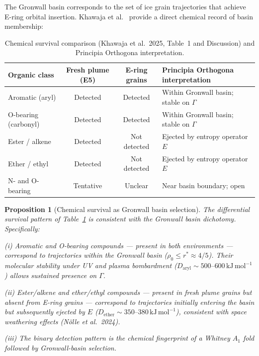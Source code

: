 \documentclass[12pt]{article}
\numberwithin{equation}{section}
\newtheorem{proposition}[theorem]{Proposition}
\theoremstyle{remark}
\begin{document}
The Gronwall basin corresponds to the set of ice grain trajectories that achieve
E-ring orbital insertion. Khawaja et al.~\cite{Khawaja2025} provide a direct
chemical record of basin membership:

\begin{table}[ht]
\centering
\small
\begin{tabular}{p{3.3cm}ccp{5.0cm}}
\toprule
Organic class & Fresh plume (E5) & E-ring grains & Principia Orthogona interpretation \\
\midrule
Aromatic (aryl) & Detected & Detected & Within Gronwall basin; stable on $\Gamma$ \\
O-bearing (carbonyl) & Detected & Detected & Within Gronwall basin; stable on $\Gamma$ \\
Ester / alkene & Detected & Not detected & Ejected by entropy operator $E$ \\
Ether / ethyl & Detected & Not detected & Ejected by entropy operator $E$ \\
N- and O-bearing & Tentative & Unclear & Near basin boundary; open \\
\bottomrule
\end{tabular}
\caption{Chemical survival comparison (Khawaja et al.\ 2025, Table~1 and Discussion)
and Principia Orthogona interpretation.}
\label{tab:chemistry}
\end{table}

\begin{proposition}[Chemical survival as Gronwall basin selection]
The differential survival pattern of Table~\ref{tab:chemistry} is consistent
with the Gronwall basin dichotomy. Specifically:

\emph{(i)} Aromatic and O-bearing compounds --- present in both environments ---
correspond to trajectories within the Gronwall basin ($\rho_0 \leq r^*\approx 4/5$).
Their molecular stability under UV and plasma bombardment
($D_{\mathrm{aryl}}\sim 500\text{--}600\,\mathrm{kJ\,mol}^{-1}$)
allows sustained presence on $\Gamma$.

\emph{(ii)} Ester/alkene and ether/ethyl compounds --- present in fresh plume grains
but absent from E-ring grains --- correspond to trajectories initially entering
the basin but subsequently ejected by $E$
($D_{\mathrm{ether}}\sim 350\text{--}380\,\mathrm{kJ\,mol}^{-1}$),
consistent with space weathering effects (N{\"o}lle et al.\ 2024).

\emph{(iii)} The binary detection pattern is the chemical fingerprint of a
Whitney $A_1$ fold followed by Gronwall-basin selection.
\end{proposition}
\end{document}
